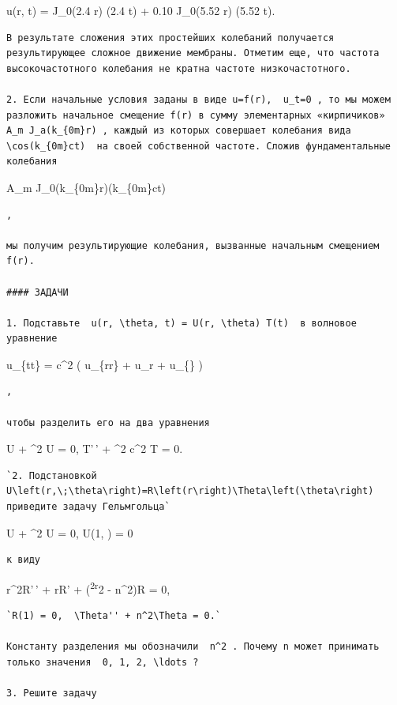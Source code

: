 \documentclass[
  ukrainian,
]{article}
\begin{document}
u(r, t) = J\_0(2.4 r) \cos(2.4 t) + 0.10 J\_0(5.52 r) \cos(5.52 t).

\begin{verbatim}
В результате сложения этих простейших колебаний получается результирующее сложное движение мембраны. Отметим еще, что частота высокочастотного колебания не кратна частоте низкочастотного.

2. Если начальные условия заданы в виде u=f(r),  u_t=0 , то мы можем разложить начальное смещение f(r) в сумму элементарных «кирпичиков»  A_m J_a(k_{0m}r) , каждый из которых совершает колебания вида  \cos(k_{0m}ct)  на своей собственной частоте. Сложив фундаментальные колебания
\end{verbatim}

A\_m J\_0(k\_\{0m\}r)\cos(k\_\{0m\}ct)

\begin{verbatim}
,

мы получим результирующие колебания, вызванные начальным смещением f(r).

#### ЗАДАЧИ

1. Подставьте  u(r, \theta, t) = U(r, \theta) T(t)  в волновое уравнение
\end{verbatim}

u\_\{tt\} = c\^{}2 \left( u\_\{rr\} +  u\_r + 
u\_\{\theta\theta\} \right)

\begin{verbatim}
,

чтобы разделить его на два уравнения
\end{verbatim}

\Delta U + \lambda\^{}2 U = 0, T'\,' + \lambda\^{}2 c\^{}2 T = 0.

\begin{verbatim}
`2. Подстановкой  U\left(r,\;\theta\right)=R\left(r\right)\Theta\left(\theta\right)  приведите задачу Гельмгольца`
\end{verbatim}

\Delta U + \lambda\^{}2 U = 0, U(1, \theta) = 0

\begin{verbatim}
к виду
\end{verbatim}

r\^{}2R'\,' + rR' + (\lambda\textsuperscript{2r}2 - n\^{}2)R = 0,

\begin{verbatim}
`R(1) = 0,  \Theta'' + n^2\Theta = 0.`

Константу разделения мы обозначили  n^2 . Почему n может принимать только значения  0, 1, 2, \ldots ?

3. Решите задачу
\end{verbatim}
\end{document}
